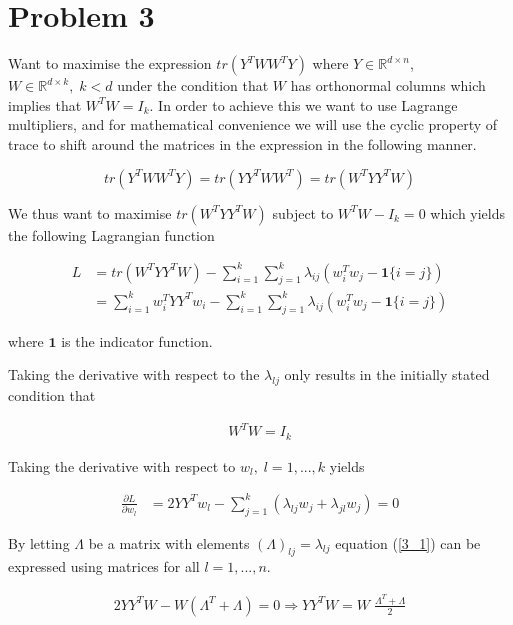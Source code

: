 \section*{Problem 3}
Want to maximise the expression $tr(Y^T W W^T Y)$ where $Y \in \mathbb{R}^{d \times n}$,
 $W \in \mathbb{R}^{d \times k}, \; k < d$ under the condition that $W$ has orthonormal columns which implies that $W^T W = I_k$. In order to achieve this we want to use Lagrange multipliers, and for mathematical convenience we will use the cyclic property of trace to shift around the matrices in the expression in the following manner.

 \begin{equation}
   tr(Y^T W W^T Y) =  tr(Y Y^T W W^T) = tr(W^T Y Y^T W)
 \end{equation}

We thus want to maximise $tr(W^T Y Y^T W)$ subject to $W^T W - I_k = 0$ which yields the following Lagrangian function

\begin{align}
  L & = tr(W^T Y Y^T W) - \sum_{i = 1}^k \sum_{j = 1}^k \lambda_{ij}(w_i^T w_j - \mathbf{1} \{i = j \}) \\
  & = \sum_{i = 1}^k w_i^T Y Y^T w_i - \sum_{i = 1}^k \sum_{j = 1}^k \lambda_{ij}(w_i^T w_j - \mathbf{1} \{i = j \})
\end{align}

where $\mathbf{1}$ is the indicator function.

Taking the derivative with respect to the $\lambda_{lj}$ only results in the initially stated condition that

\begin{align}
  W^T W = I_k
  \label{cond_1}
\end{align}

Taking the derivative with respect to $w_l, \; l = 1,..., k$ yields

\begin{align}
  \frac{\partial L}{\partial w_l} & = 2 Y Y^T w_l - \sum_{j = 1}^k (\lambda_{lj} w_j + \lambda_{jl} w_j) = 0
  \label{3_1}
\end{align}

By letting $\Lambda$ be a matrix with elements $(\Lambda)_{lj} = \lambda_{lj}$ equation (\ref{3_1}) can be expressed using matrices for all $l = 1,..., n$.

\begin{align}
  2 Y Y^T W - W(\Lambda^T + \Lambda) = 0 \Rightarrow Y Y^T W = W \; \frac{\Lambda^T + \Lambda}{2}
  \label{3_2}
\end{align}

